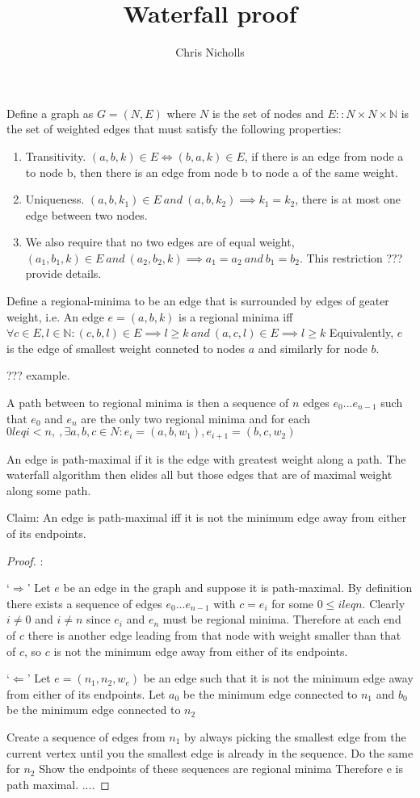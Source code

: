 \documentclass{journal}
\title{\LARGE \bf
Waterfall proof
}
\author{Chris Nicholls
}
\begin{document}
Define a graph as $G = (N,E)$
where $N$ is the set of nodes and $E :: N\times N \times \mathbb{N}$ is the set of weighted edges
that must satisfy the following properties:
\begin{enumerate}
\item Transitivity. $(a,b,k) \in E  \iff (b,a,k) \in E$, if there is an edge from node a to node b, then there is an edge from node b to node a of the same weight.
\item Uniqueness.   $(a,b,k_1) \in E\ and\ (a,b,k_2) \implies k_1 = k_2$, there is at most one edge between two nodes.
\item We also require that no two edges are of equal weight, $(a_1,b_1,k) \in E\ and\ (a_2,b_2,k) \implies a_1 = a_2\ and\ b_1 = b_2$. This restriction ??? provide details.

\end{enumerate}

Define a regional-minima to be an edge that is surrounded by edges of geater weight, i.e.
An edge $e = (a,b,k)$ is a regional minima iff
$\forall c \in E, l \in \mathbb{N} :
  (c,b,l) \in E \implies l \geq k\ and\
  (a,c,l) \in E \implies l \geq k $
Equivalently, $e$ is the edge of smallest weight conneted to nodes $a$ and similarly for node $b$.

??? example.

A path between to regional minima is then a sequence of $n$ edges $e_0 ... e_{n-1}$
such that $e_0$ and $e_n$ are the only two regional minima
and for each $ 0 leq i < n,\ , \exists a,b,c \in N \colon e_i = (a,b,w_1) , e_{i+1} = (b,c,w_2)$

\noindent An edge is path-maximal if it is the edge with greatest weight along a path.
The waterfall algorithm then elides all but those edges that are of maximal weight along some path.

\noindent Claim: An edge is path-maximal iff it is not the minimum edge away from either of its endpoints.

\begin{proof}:

\noindent `$\Rightarrow$'
\indent
  Let $e$ be an edge in the graph and suppose it is path-maximal.
  By definition there exists a sequence of edges $e_0 ... e_{n-1}$
  with $c = e_i$ for some $ 0 \leq i leq n$. Clearly $i \neq 0$ and $i \neq n$ since
  $e_i$ and $e_n$ must be regional minima. Therefore at each end of $c$ there is another edge
  leading from that node with weight smaller than that of $c$, so $c$ is
  not the minimum edge away from either of its endpoints.


\noindent
`$\Leftarrow$'
\indent
  Let $e = (n_1,n_2,w_e)$ be an edge such that it is not the minimum edge away from either of its endpoints.
  Let  $a_0$ be the minimum edge connected to $n_1$ and $b_0$ be the minimum edge connected to $n_2$

  Create a sequence of edges from $n_1$ by always picking the smallest edge from the current vertex until
  you the smallest edge is already in the sequence.
  Do  the same for $n_2$
  Show the endpoints of these sequences are regional minima
  Therefore e is path maximal.
  ....


\end{proof}
\end{document}
